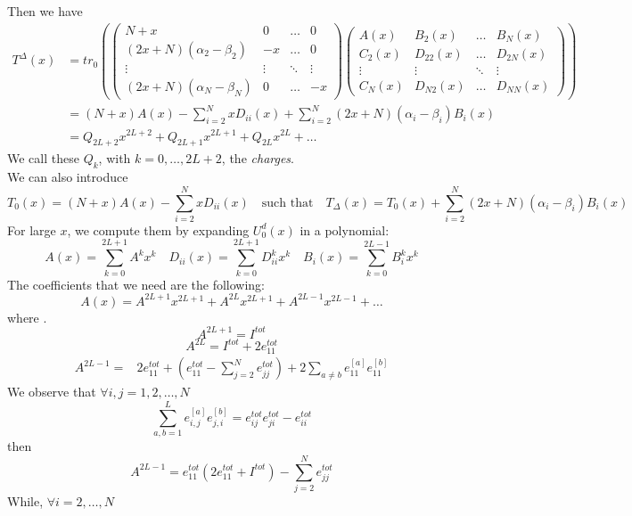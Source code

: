 \documentclass[11pt]{article}
\numberwithin{equation}{section}
\numberwithin{equation}{subsection}
\begin{document}
Then we have
\begin{equation}
	\begin{split}
	T^{\Delta}(x)&=tr_{0}\left(\begin{pmatrix}
		N+x&0&\ldots&0\\
		(2x+N)(\alpha_{2}-\beta_{2})&-x&\ldots&0\\
		\vdots&\vdots&\ddots&\vdots\\
		(2x+N)(\alpha_{N}-\beta_{N})&0&\ldots&-x
	\end{pmatrix}\begin{pmatrix}
	A(x)&B_{2}(x)&\ldots&B_{N}(x)\\
	C_{2}(x)&D_{22}(x)&\ldots&D_{2N}(x)\\
	\vdots&\vdots&\ddots&\vdots\\
	C_{N}(x)&D_{N2}(x)&\ldots&D_{NN}(x)
\end{pmatrix}\right)\\&=
(N+x)A(x)-\sum_{i=2}^{N}xD_{ii}(x)+\sum_{i=2}^{N}(2x+N)(\alpha_{i}-\beta_{i})B_{i}(x)\\&=
Q_{2L+2}x^{2L+2}+Q_{2L+1}x^{2L+1}+Q_{2L}x^{2L}+\ldots
\end{split}
\end{equation}
We call these $Q_{k}$, with $k=0,\ldots,2L+2$, the \textit{charges}. \\
We can also introduce 
\begin{equation}
	T_{0}(x)=(N+x)A(x)-\sum_{i=2}^{N}xD_{ii}(x)\quad\text{such that}\quad T_{\Delta}(x)=T_{0}(x)+\sum_{i=2}^{N}(2x+N)(\alpha_{i}-\beta_{i})B_{i}(x)
\end{equation}For large $x$, we compute them by expanding $U_{0}^{d}(x)$ in a polynomial: 
\begin{equation}
	A(x)=\sum_{k=0}^{2L+1}A^{k}x^{k}\quad D_{ii}(x)=\sum_{k=0}^{2L+1}D_{ii}^{k}x^{k}\quad B_{i}(x)=\sum_{k=0}^{2L-1}B_{i}^{k}x^{k}
\end{equation}
The coefficients that we need are the following:
\begin{equation}
	A(x)=A^{2L+1}x^{2L+1}+A^{2L}x^{2L+1}+A^{2L-1}x^{2L-1}+\ldots
\end{equation}
where .
\begin{equation}
	A^{2L+1}=I^{tot}
\end{equation}
\begin{equation}
	A^{2L}=I^{tot}+2e_{11}^{tot}
\end{equation}
\begin{equation}
	\begin{split}
		A^{2L-1}=&2e_{11}^{tot}+\left(e_{11}^{tot}-\sum_{j=2}^{N}e_{jj}^{tot}\right)+2\sum_{a\neq b}e_{11}^{[a]}e_{11}^{[b]}
	\end{split}
\end{equation}
We observe that $\forall i,j=1,2,\ldots,N$
\begin{equation}
	\sum_{a,b=1}^{L}e_{i,j}^{[a]}e_{j,i}^{[b]}=e_{ij}^{tot}e_{ji}^{tot}-e_{ii}^{tot}
\end{equation}
then 
\begin{equation}
	\boxed{A^{2L-1}=e_{11}^{tot}\left(2e_{11}^{tot}+I^{tot}\right)-\sum_{j=2}^{N}e_{jj}^{tot}}
\end{equation}
While, $\forall i=2,\ldots,N$
\end{document}
